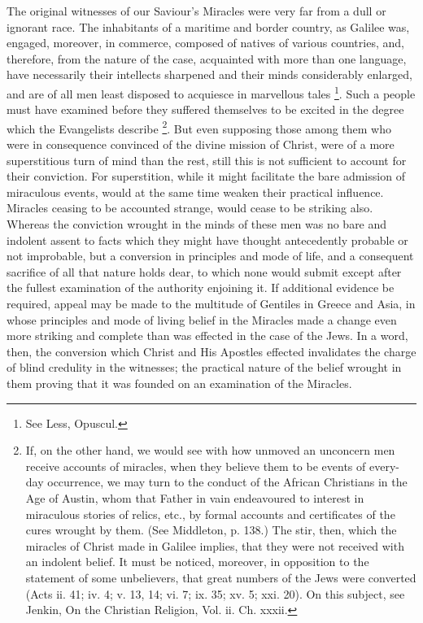 The original witnesses of our Saviour's Miracles
were very far from a dull or ignorant race. The inhabitants of a
maritime and border country, as Galilee was, engaged, moreover, in
commerce, composed of natives of various countries, and, therefore,
from the nature of the case, acquainted with more than one language,
have necessarily their intellects sharpened and their minds
considerably enlarged, and are of all men least disposed to acquiesce
in marvellous tales \footnote{See Less, Opuscul.}.
Such a people must have examined before they suffered themselves to be
excited in the degree which the Evangelists describe \footnote{If, on the other hand, we would see with how unmoved an unconcern men
receive accounts of miracles, when they believe them to be events of
every-day occurrence, we may turn to the conduct of the African
Christians in the Age of Austin, whom that Father in vain endeavoured
to interest in miraculous stories of relics, etc., by formal accounts
and certificates of the cures wrought by them. (See Middleton, p.
138.) The stir, then, which the miracles of Christ made in Galilee
implies, that they were not received with an indolent belief. It must
be noticed, moreover, in opposition to the statement of some
unbelievers, that great numbers of the Jews were converted (Acts ii.
41; iv. 4; v. 13, 14; vi. 7; ix. 35; xv. 5; xxi. 20). On this subject,
see Jenkin, On the Christian Religion, Vol. ii. Ch. xxxii.}. But even supposing those among them who were in
consequence convinced of the divine mission of Christ, were of a more
superstitious turn of mind than the rest, still this is not sufficient
to account for their conviction. For superstition, while it might
facilitate the bare admission of miraculous events, would at the same
time weaken their practical influence. Miracles ceasing to be
accounted strange, would cease to be striking also. Whereas the
conviction wrought in the minds of these men was no bare and indolent
assent to facts which they might have thought antecedently probable or
not improbable, but a conversion in principles and mode of life, and a
consequent sacrifice of all that nature holds dear, to which none
would submit except after the fullest examination of the authority
enjoining it. If additional evidence be required, appeal may be made
to the multitude of Gentiles in Greece and Asia, in whose principles
and mode of living belief in the Miracles made a change even more
striking and complete than was effected in the case of the Jews. In a
word, then, the conversion which Christ and His Apostles effected
invalidates the charge of blind credulity in the witnesses; the
practical nature of the belief wrought in them proving that it was
founded on an examination of the Miracles.


